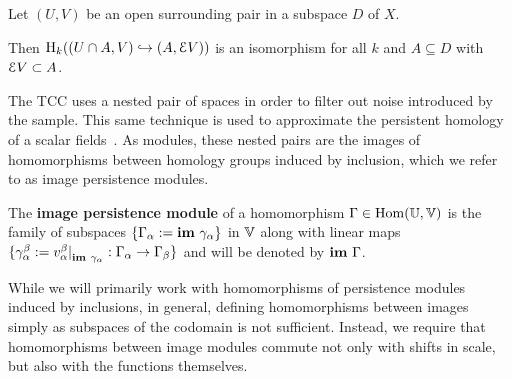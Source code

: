 \begin{lemma}\label{lem:excision}
  Let $(U, V)$ be an open surrounding pair in a subspace $D$ of $X$.

  Then $\mathrm{H}_k((U\cap A, V)\hookrightarrow (A, \mathcal{E} V))$ is an isomorphism for all $k$ and $A\subseteq D$ with $\mathcal{E} V\subset A$.
\end{lemma}

The TCC uses a nested pair of spaces in order to filter out noise introduced by the sample.
This same technique is used to approximate the persistent homology of a scalar fields~\cite{chazal09analysis}.
As modules, these nested pairs are the images of homomorphisms between homology groups induced by inclusion, which we refer to as image persistence modules.

\begin{definition}
  The \textbf{image persistence module} of a homomorphism $\Gamma\in\mathrm{Hom}(\mathbb{U},\mathbb{V})$ is the family of subspaces $\{\Gamma_\alpha :=\mathbf{im}~\gamma_\alpha\}$ in $\mathbb{V}$ along with linear maps $\{\gamma_\alpha^\beta := v_\alpha^\beta\mathord{\mid}_{\mathbf{im}~\gamma_\alpha} : \Gamma_\alpha\to\Gamma_\beta\}$ and will be denoted by $\mathbf{im}~\Gamma$.
\end{definition}

While we will primarily work with homomorphisms of persistence modules induced by inclusions, in general, defining homomorphisms between images simply as subspaces of the codomain is not sufficient.
Instead, we require that homomorphisms between image modules commute not only with shifts in scale, but also with the functions themselves.

